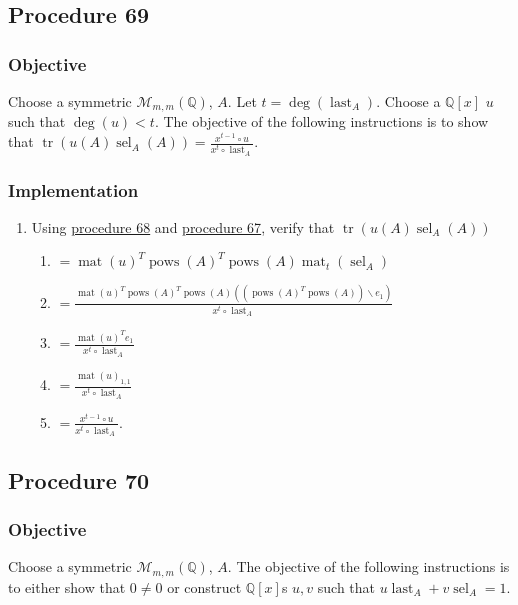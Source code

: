 \documentclass[twocolumn]{article}
\DeclareMathOperator{\mat}{mat}
\DeclareMathOperator{\tr}{tr}
\DeclareMathOperator{\pows}{pows}
\DeclareMathOperator{\sel}{sel}
\DeclareMathOperator{\last}{last}
\begin{document}
		\subsection{Procedure 69}\label{sec:procedure 69}
			\subsubsection{Objective}
				Choose a symmetric $\mathcal{M}_{m,m}(\mathbb{Q})$, $A$. Let $t=\deg(\last_A)$. Choose a $\mathbb{Q}[x]$ $u$ such that $\deg(u)<t$. The objective of the following instructions is to show that $\tr(u(A)\sel_A(A))=\frac{x^{t-1}\circ u}{x^t\circ\last_A}$.
			\subsubsection{Implementation}
				\begin{enumerate}
					\item Using \hyperref[sec:procedure 68]{procedure 68} and \hyperref[sec:procedure 67]{procedure 67}, verify that $\tr(u(A)\sel_A(A))$
					\begin{enumerate}
						\item $=\mat(u)^T\pows(A)^T\pows(A)\mat_t(\sel_A)$
						\item $=\frac{\mat(u)^T\pows(A)^T\pows(A)((\pows(A)^T\pows(A))\backslash e_1)}{x^t\circ\last_A}$
						\item $=\frac{\mat(u)^Te_1}{x^t\circ\last_A}$
						\item $=\frac{\mat(u)_{1,1}}{x^t\circ\last_A}$
						\item $=\frac{x^{t-1}\circ u}{x^t\circ\last_A}$.
					\end{enumerate}
				\end{enumerate}
		\subsection{Procedure 70}\label{sec:procedure 70}
			\subsubsection{Objective}
				Choose a symmetric $\mathcal{M}_{m,m}(\mathbb{Q})$, $A$. The objective of the following instructions is to either show that $0\ne 0$ or construct $\mathbb{Q}[x]$s $u,v$ such that $u\last_A+v\sel_A=1$.
\end{document}
